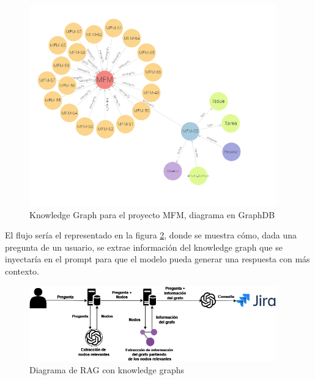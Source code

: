 \begin{figure}[H]
    \centering
    \includegraphics[width=0.95\textwidth]{images/desglose_kg.png}
    \caption{Knowledge Graph para el proyecto MFM, diagrama en GraphDB}\label{fig:desglose_kg}
\end{figure}

El flujo sería el representado en la figura \ref{fig:kg}, donde se muestra cómo, dada una pregunta de un usuario, se extrae información del knowledge graph que se inyectaría en el prompt para que el modelo pueda generar una respuesta con más contexto.

\begin{figure}[H]
    \centering
    \includegraphics[width=0.95\textwidth]{images/rag_grafo.png}
    \caption{Diagrama de RAG con knowledge graphs}\label{fig:kg}
\end{figure}
